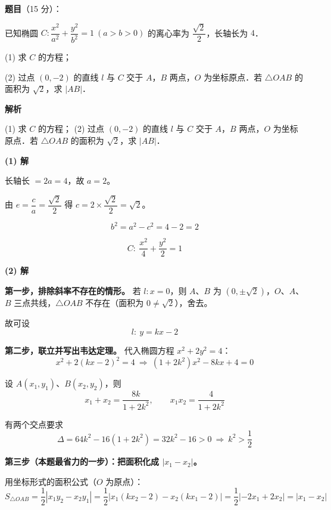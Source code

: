 \begin{answer}

\textbf{题目}（15 分）：

已知椭圆 $C:\dfrac{x^2}{a^2}+\dfrac{y^2}{b^2}=1\ (a>b>0)$ 的离心率为 $\dfrac{\sqrt2}{2}$，长轴长为 $4$．

  (1) 求 $C$ 的方程；

  (2) 过点 $(0,-2)$ 的直线 $l$ 与 $C$ 交于 $A$，$B$ 两点，$O$ 为坐标原点．若 $\triangle OAB$ 的面积为 $\sqrt2$，求 $|AB|$．

\textbf{解析}

  (1) 求 $C$ 的方程；
  (2) 过点 $(0,-2)$ 的直线 $l$ 与 $C$ 交于 $A$，$B$ 两点，$O$ 为坐标原点．若 $\triangle OAB$ 的面积为 $\sqrt2$，求 $|AB|$．

\par\medskip

\textbf{(1) 解}

长轴长 $=2a=4$，故 $a=2$。

由 $e=\dfrac ca=\dfrac{\sqrt2}{2}$ 得 $c=2\times\dfrac{\sqrt2}{2}=\sqrt2$。

\nopagebreak[4]
\[b^2=a^2-c^2=4-2=2\]

\nopagebreak[4]
\[\boxed{C:\ \frac{x^2}{4}+\frac{y^2}{2}=1}\]

\par\medskip

\textbf{(2) 解}

\textbf{第一步，排除斜率不存在的情形。} 若 $l:x=0$，则 $A$、$B$ 为 $\left(0,\pm\sqrt2\right)$，$O$、$A$、$B$ 三点共线，$\triangle OAB$ 不存在（面积为 $0\ne\sqrt2$），舍去。

故可设
\nopagebreak[4]
\[l:\ y=kx-2\]

\textbf{第二步，联立并写出韦达定理。} 代入椭圆方程 $x^2+2y^2=4$：
\nopagebreak[4]
\[x^2+2(kx-2)^2=4\ \Longrightarrow\ \left(1+2k^2\right)x^2-8kx+4=0\]

设 $A(x_1,y_1)$、$B(x_2,y_2)$，则
\nopagebreak[4]
\[x_1+x_2=\frac{8k}{1+2k^2},\qquad x_1x_2=\frac{4}{1+2k^2}\]

有两个交点要求
\nopagebreak[4]
\[\Delta=64k^2-16\left(1+2k^2\right)=32k^2-16>0\ \Longrightarrow\ k^2>\frac12\]

\textbf{第三步（本题最省力的一步）：把面积化成 $|x_1-x_2|$。}

用坐标形式的面积公式（$O$ 为原点）：
\nopagebreak[4]
\[S_{\triangle OAB}=\frac12\left|x_1y_2-x_2y_1\right|=\frac12\left|x_1\left(kx_2-2\right)-x_2\left(kx_1-2\right)\right|=\frac12\left|-2x_1+2x_2\right|=\left|x_1-x_2\right|\]


\end{answer}
